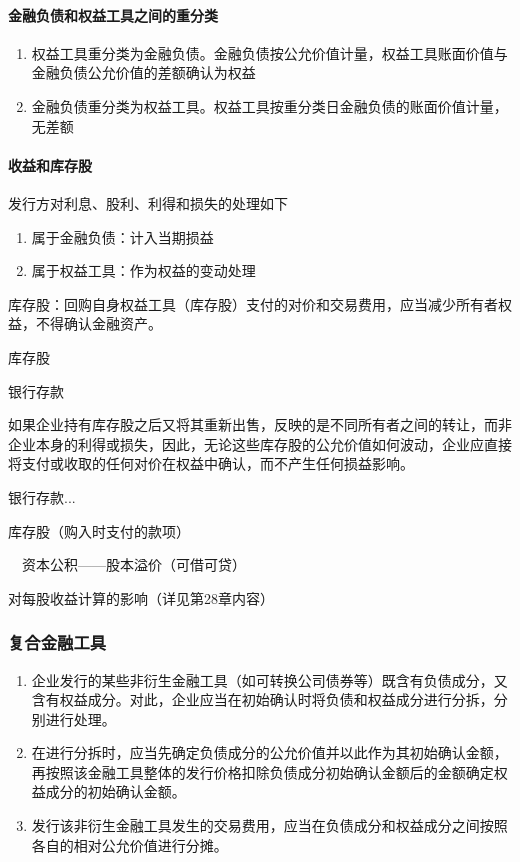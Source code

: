 \documentclass[UTF8,12pt]{ctexart}
\newenvironment{Dr}{%
	\begin{list}{}%
		{
			\setlength{\leftmargin}{2em}
			\setlength{\labelwidth}{2em}
			\setlength{\labelsep}{0pt}
			\setlength{\itemindent}{0pt}
			\setlength{\listparindent}{0pt}
			\setlength{\parsep}{0pt}
			\setlength{\topsep}{0pt}
		}
		\item[\textbf{借：}]
	}{%
	\end{list}
}
\newenvironment{Cr}{%
	\begin{list}{}%
		{
			\setlength{\leftmargin}{2em}
			\setlength{\labelwidth}{2em}
			\setlength{\labelsep}{0pt}
			\setlength{\itemindent}{0pt}
			\setlength{\listparindent}{0pt}
			\setlength{\parsep}{0pt}
			\setlength{\topsep}{0pt}
		}
		\item[\textbf{贷：}]
	}{%
	\end{list}
}
\numberwithin{equation}{section} %
\numberwithin{figure}{section}
\numberwithin{table}{section}
\begin{document}
	\paragraph{金融负债和权益工具之间的重分类}
	\begin{enumerate}
		\item 权益工具重分类为金融负债。金融负债按公允价值计量，权益工具账面价值与金融负债公允价值的差额确认为权益 
		
		\item 金融负债重分类为权益工具。权益工具按重分类日金融负债的账面价值计量，无差额
	\end{enumerate}
	
	\paragraph{收益和库存股}
	发行方对利息、股利、利得和损失的处理如下
	\begin{enumerate}
		\item 属于金融负债：计入当期损益
		
		\item 属于权益工具：作为权益的变动处理
	\end{enumerate}

	库存股：回购自身权益工具（库存股）支付的对价和交易费用，应当减少所有者权益，不得确认金融资产。
	
	\begin{Dr}
		库存股
	\end{Dr}
	\begin{Cr}
		银行存款
	\end{Cr}
	
	如果企业持有库存股之后又将其重新出售，反映的是不同所有者之间的转让，而非企业本身的利得或损失，因此，无论这些库存股的公允价值如何波动，企业应直接将支付或收取的任何对价在权益中确认，而不产生任何损益影响。
	
	\begin{Dr}
		银行存款...
	\end{Dr}
	\begin{Cr}
		库存股（购入时支付的款项）
		
		\ \ 资本公积——股本溢价（可借可贷）
	\end{Cr}
	
	
	对每股收益计算的影响（详见第28章内容）
	
	\subsubsection{复合金融工具}
	\begin{enumerate}
		\item 企业发行的某些非衍生金融工具（如可转换公司债券等）既含有负债成分，又含有权益成分。对此，企业应当在初始确认时将负债和权益成分进行分拆，分别进行处理。
		
		\item 在进行分拆时，应当先确定负债成分的公允价值并以此作为其初始确认金额，再按照该金融工具整体的发行价格扣除负债成分初始确认金额后的金额确定权益成分的初始确认金额。
		
		\item 发行该非衍生金融工具发生的交易费用，应当在负债成分和权益成分之间按照各自的相对公允价值进行分摊。
	\end{enumerate}
	
\end{document}

